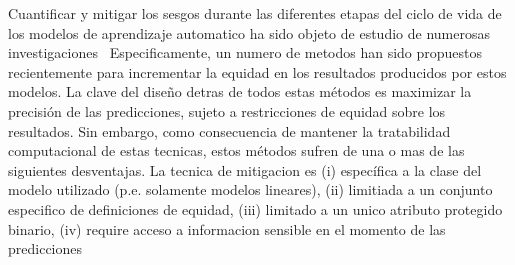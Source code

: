 



Cuantificar y mitigar los sesgos durante las diferentes etapas del ciclo de vida de los modelos de aprendizaje automatico ha sido objeto de estudio de numerosas investigaciones~
Especificamente, un numero de metodos han sido propuestos recientemente para incrementar la equidad en los resultados producidos por estos modelos.
La clave del diseño detras de todos estas métodos es maximizar la precisión de las predicciones, sujeto a restricciones de equidad sobre los resultados.
Sin embargo, como consecuencia de mantener la tratabilidad computacional de estas tecnicas, estos métodos sufren de una o mas de las siguientes desventajas.
La tecnica de mitigacion es
(i) específica a la clase del modelo utilizado (p.e. solamente modelos lineares),
(ii) limitiada a un conjunto especifico de definiciones de equidad,
(iii) limitado a un unico atributo protegido binario,
(iv) require acceso a informacion sensible en el momento de las predicciones

